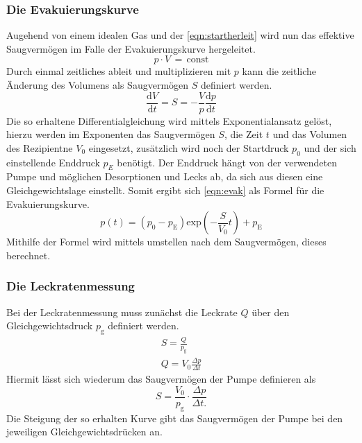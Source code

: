\subsubsection{Die Evakuierungskurve}
Augehend von einem idealen Gas und der \autoref{eqn:startherleit} wird nun das effektive Saugvermögen im Falle der Evakuierungskurve hergeleitet.
\begin{equation}
    p\cdot V\,=\, \text{const}
    \label{eqn:startherleit}
\end{equation}
Durch einmal zeitliches ableit und multiplizieren mit $p$ kann die zeitliche Änderung des Volumens als Saugvermögen $S$ definiert werden.
\begin{equation}
\frac{\text{d}V}{\text{d}t} = S = - \frac{V}{p} \frac{\text{d}p}{\text{d}t}
\end{equation}
Die so erhaltene Differentialgleichung wird mittels Exponentialansatz gelöst, hierzu werden im Exponenten das Saugvermögen $S$, die Zeit $t$ und das 
Volumen des Rezipientne $V_0$ eingesetzt, zusätzlich wird noch der Startdruck $p_0$ und der sich einstellende Enddruck $p_E$ benötigt. Der Enddruck 
hängt von der verwendeten Pumpe und möglichen Desorptionen und Lecks ab, da sich aus diesen eine Gleichgewichtslage einstellt. 
Somit ergibt sich \autoref{eqn:evak} als Formel für die Evakuierungskurve.
\begin{equation}
    p(t) = (p_0 - p_\text{E}) \text{exp}\left( - \frac{S}{V_0}t \right) + p_\text{E}
    \label{eqn:evak}
\end{equation}
Mithilfe der Formel wird mittels umstellen nach dem Saugvermögen, dieses berechnet.
\subsubsection{Die Leckratenmessung}
Bei der Leckratenmessung muss zunächst die Leckrate $Q$ über den Gleichgewichtsdruck $p_\text{g}$ definiert werden.
\begin{align}
    S = \frac{Q}{p_\text{g}}
\\
Q = V_0 \frac{\Delta p}{\Delta t}
\end{align}
 Hiermit lässt sich wiederum das Saugvermögen der Pumpe definieren als
 \begin{equation}   
    S = \frac{V_0}{p_\text{g}} \cdot \frac{\Delta p}{\Delta t.}
 \end{equation}
 Die Steigung der so erhalten Kurve gibt das Saugvermögen der Pumpe bei den jeweiligen Gleichgewichtsdrücken an.

